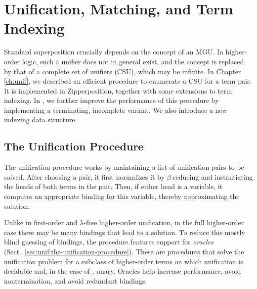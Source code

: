 \section{Unification, Matching, and Term Indexing}
\label{sec:ehoh2:unif-match-index}


Standard superposition crucially depends on the concept of an MGU. In higher-order logic, such a unifier does not in general exist,
and the concept
is replaced by that of a complete set of unifiers (CSU), which may be infinite.
In Chapter \ref{ch:unif}, we described an efficient procedure to enumerate a CSU
for a term pair. It is implemented in Zipperposition, together with some
extensions to term indexing. In \ehohii{}, we further improve the performance of
this procedure by implementing a terminating, incomplete variant. We also
introduce a new indexing data structure.

\subsection{The Unification Procedure} 
The unification procedure works by maintaining a list of unification pairs to be solved.
After choosing a pair, it first normalizes it by $\beta$-reducing and
instantiating the heads of both terms in the pair. Then, if either head is a
variable, it computes an appropriate binding for this variable, thereby
approximating the solution.

Unlike in first-order and $\lambda$-free higher-order unification, in the full
higher-order case there may be many bindings that lead to a solution. To reduce
this mostly blind guessing of bindings, the procedure features support for
\emph{oracles} (Sect.~\ref{sec:unif:the-unification-procedure}). These are
procedures that solve the unification problem for a subclass of higher-order
terms on which unification is decidable and, in the case of \ehohii{}, unary. Oracles help
increase performance, avoid nontermination, and avoid redundant bindings.


